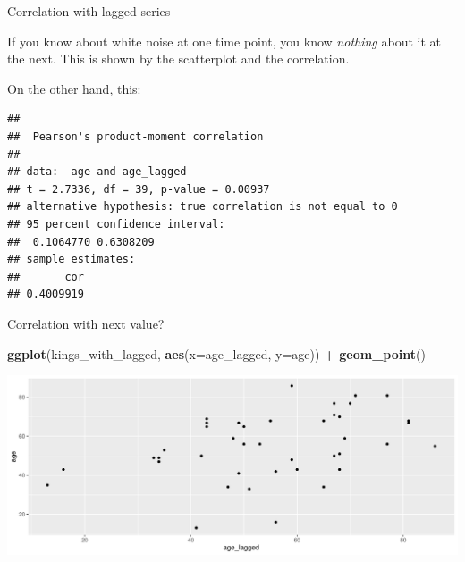 \documentclass[
  ignorenonframetext,
]{beamer}
\newenvironment{Shaded}{\begin{snugshade}}{\end{snugshade}}
\newcommand{\DataTypeTok}[1]{\textcolor[rgb]{0.13,0.29,0.53}{#1}}
\newcommand{\KeywordTok}[1]{\textcolor[rgb]{0.13,0.29,0.53}{\textbf{#1}}}
\newcommand{\NormalTok}[1]{#1}
\newcommand{\OperatorTok}[1]{\textcolor[rgb]{0.81,0.36,0.00}{\textbf{#1}}}
\newcommand{\StringTok}[1]{\textcolor[rgb]{0.31,0.60,0.02}{#1}}
\begin{document}
\begin{frame}[fragile]{Correlation with lagged series}
\protect\hypertarget{correlation-with-lagged-series}{}

If you know about white noise at one time point, you know \emph{nothing}
about it at the next. This is shown by the scatterplot and the
correlation.

On the other hand, this:

\footnotesize

\begin{Shaded}
\end{Shaded}

\begin{verbatim}
## 
##  Pearson's product-moment correlation
## 
## data:  age and age_lagged
## t = 2.7336, df = 39, p-value = 0.00937
## alternative hypothesis: true correlation is not equal to 0
## 95 percent confidence interval:
##  0.1064770 0.6308209
## sample estimates:
##       cor 
## 0.4009919
\end{verbatim}

\normalsize

\end{frame}

\begin{frame}[fragile]{Correlation with next value?}
\protect\hypertarget{correlation-with-next-value}{}

\begin{Shaded}
\begin{Highlighting}[]
\KeywordTok{ggplot}\NormalTok{(kings_with_lagged, }\KeywordTok{aes}\NormalTok{(}\DataTypeTok{x=}\NormalTok{age_lagged, }\DataTypeTok{y=}\NormalTok{age)) }\OperatorTok{+}\StringTok{ }
\StringTok{  }\KeywordTok{geom_point}\NormalTok{()}
\end{Highlighting}
\end{Shaded}

\includegraphics{slides_d29_files/figure-beamer/unnamed-chunk-537-1.pdf}

\end{frame}
\end{document}
